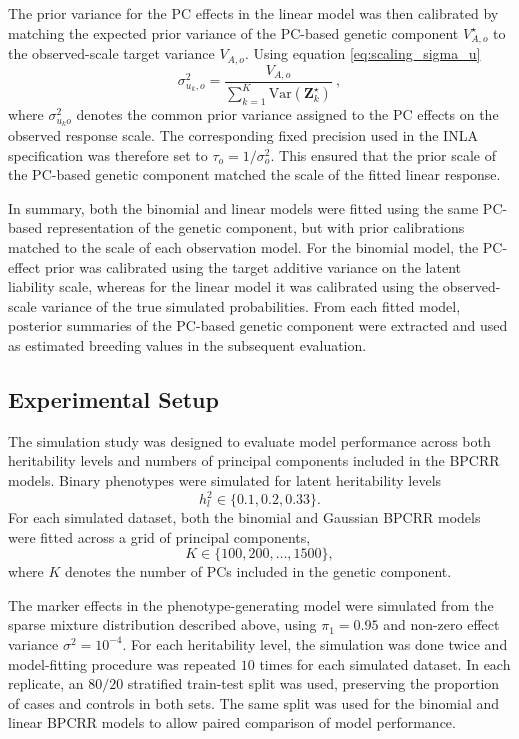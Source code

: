 The prior variance for the PC effects in the linear model was then calibrated by matching the expected prior variance of the PC-based genetic component $V_{A,o}^\star$ to the observed-scale target variance $V_{A,o}$. Using equation \eqref{eq:scaling_sigma_u}
%
\[
\sigma_{u_k,o}^2 = \frac{V_{A,o}}{\sum_{k = 1}^K \mathrm{Var}(\mathbf{Z}^\star_k)} \ ,
\]
%
where $\sigma_{u_ko}^2$ denotes the common prior variance assigned to the PC effects on the observed response scale. The corresponding fixed precision used in the INLA specification was therefore set to
\(
\tau_o = 1/\sigma_o^2.
\)
This ensured that the prior scale of the PC-based genetic component matched the scale of the fitted linear response.


In summary, both the binomial and linear models were fitted using the same PC-based representation of the genetic component, but with prior calibrations matched to the scale of each observation model. For the binomial model, the PC-effect prior was calibrated using the target additive variance on the latent liability scale, whereas for the linear model it was calibrated using the observed-scale variance of the true simulated probabilities. From each fitted model, posterior summaries of the PC-based genetic component were extracted and used as estimated breeding values in the subsequent evaluation.

\subsection{Experimental Setup}\label{sec:experimental_setup}

The simulation study was designed to evaluate model performance across both heritability levels and numbers of principal components included in the BPCRR models. Binary phenotypes were simulated for latent heritability levels
\[
h_l^2 \in \{0.1, 0.2, 0.33\}.
\]
For each simulated dataset, both the binomial and Gaussian BPCRR models were fitted across a grid of principal components,
\[
K \in \{100, 200, \dots, 1500\},
\]
where $K$ denotes the number of PCs included in the genetic component.

The marker effects in the phenotype-generating model were simulated from the sparse mixture distribution described above, using $\pi_1 = 0.95$ and non-zero effect variance $\sigma^2 = 10^{-4}$. For each heritability level, the simulation was done twice and model-fitting procedure was repeated $10$ times for each simulated dataset. In each replicate, an $80/20$ stratified train-test split was used, preserving the proportion of cases and controls in both sets. The same split was used for the binomial and linear BPCRR models to allow paired comparison of model performance.

